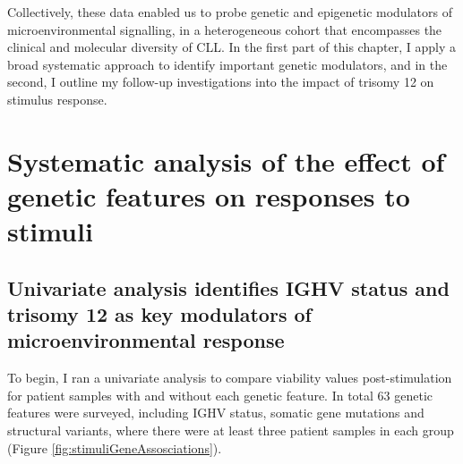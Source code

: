 \documentclass[11pt, a4paper, twosided]{book}
\begin{document}
Collectively, these data enabled us to probe genetic and epigenetic modulators of microenvironmental signalling, in a heterogeneous cohort that encompasses the clinical and molecular diversity of CLL. In the first part of this chapter, I apply a broad systematic approach to identify important genetic modulators, and in the second, I outline my follow-up investigations into the impact of trisomy 12 on stimulus response.

\hypertarget{systematic-analysis-of-the-effect-of-genetic-features-on-responses-to-stimuli}{%
\section{Systematic analysis of the effect of genetic features on responses to stimuli}\label{systematic-analysis-of-the-effect-of-genetic-features-on-responses-to-stimuli}}

\hypertarget{univariate-gene-stimulus-assosciations}{%
\subsection{Univariate analysis identifies IGHV status and trisomy 12 as key modulators of microenvironmental response}\label{univariate-gene-stimulus-assosciations}}

To begin, I ran a univariate analysis to compare viability values post-stimulation for patient samples with and without each genetic feature. In total 63 genetic features were surveyed, including IGHV status, somatic gene mutations and structural variants, where there were at least three patient samples in each group (Figure \ref{fig:stimuliGeneAssosciations}).
\end{document}
